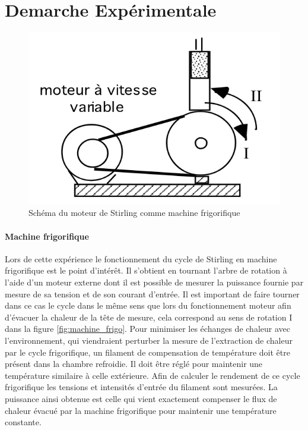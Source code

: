 \section{Demarche Expérimentale}






\begin{minipage}{\linewidth}
    \begin{figure}
        \includegraphics[width=\linewidth]{figures/machine-frigo.png}
        \caption{Schéma du moteur de Stirling comme machine frigorifique}
        \label{fig:machine_frigo}
    \end{figure}

    \paragraph*{Machine frigorifique}
    Lors de cette expérience le fonctionnement du cycle de Stirling en machine frigorifique est le point d'intérêt. Il s'obtient en tournant l'arbre de rotation à l'aide d'un moteur externe dont il est possible de mesurer la puissance fournie par mesure de sa tension et de son courant d'entrée. Il est important de faire tourner dans ce cas le cycle dans le même sens que lors du fonctionnement moteur afin d'évacuer la chaleur de la tête de mesure, cela correspond au sens de rotation I dans la figure \autoref{fig:machine_frigo}. Pour minimiser les échanges de chaleur avec l'environnement, qui viendraient perturber la mesure de l'extraction de chaleur par le cycle frigorifique, un filament de compensation de température doit être présent dans la chambre refroidie. Il doit être réglé pour maintenir une température similaire à celle extérieure. Afin de calculer le rendement de ce cycle frigorifique les tensions et intensités d'entrée du filament sont mesurées. La puissance ainsi obtenue est celle qui vient exactement compenser le flux de chaleur évacué par la machine frigorifique pour maintenir une température constante.
\end{minipage}

